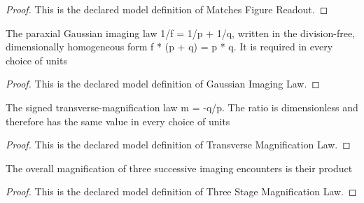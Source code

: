 \begin{proof}
  This is the declared model definition of Matches Figure Readout.
\end{proof}
\begin{definition}
  \label{def:physics:phyx-mini-0030:phyxminiproblems-problemphyxmini0030-gaussianimaginglaw}
  The paraxial Gaussian imaging law 1/f = 1/p + 1/q, written in the division-free, dimensionally homogeneous form f * (p + q) = p * q. It is required in every choice of units
\end{definition}
\begin{proof}
  This is the declared model definition of Gaussian Imaging Law.
\end{proof}
\begin{definition}
  \label{def:physics:phyx-mini-0030:phyxminiproblems-problemphyxmini0030-transversemagnificationlaw}
  The signed transverse-magnification law m = -q/p. The ratio is dimensionless and therefore has the same value in every choice of units
\end{definition}
\begin{proof}
  This is the declared model definition of Transverse Magnification Law.
\end{proof}
\begin{definition}
  \label{def:physics:phyx-mini-0030:phyxminiproblems-problemphyxmini0030-threestagemagnificationlaw}
  The overall magnification of three successive imaging encounters is their product
\end{definition}
\begin{proof}
  This is the declared model definition of Three Stage Magnification Law.
\end{proof}

